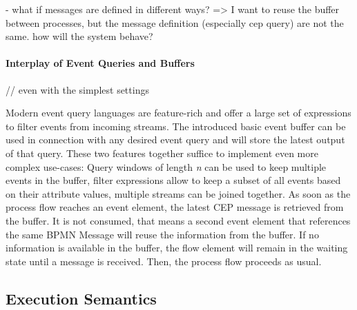 - what if messages are defined in different ways? => I want to reuse the buffer between processes, but the message definition (especially cep query) are not the same. how will the system behave?

\paragraph{Interplay of Event Queries and Buffers}

// even with the simplest settings

Modern event query languages are feature-rich and offer a large set of expressions to filter events from incoming streams. 
The introduced basic event buffer can be used in connection with any desired event query and will store the latest output of that query.
These two features together suffice to implement even more complex use-cases: Query windows of length \textit{n} can be used to keep multiple events in the buffer, filter expressions allow to keep a subset of all events based on their attribute values, multiple streams can be joined together.
As soon as the process flow reaches an event element, the latest CEP message is retrieved from the buffer. It is not consumed, that means a second event element that references the same BPMN Message will reuse the information from the buffer.
If no information is available in the buffer, the flow element will remain in the waiting state until a message is received. Then, the process flow proceeds as usual.

\subsection{Execution Semantics}
